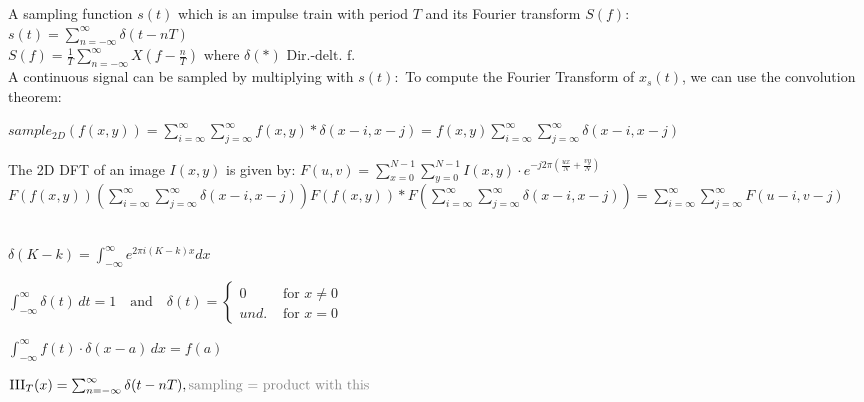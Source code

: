 
A sampling function $s(t)$ which is an impulse train with period $T$ and its Fourier transform $S(f)$:\\
\color{gray}
$s(t) = \sum_{n = -\infty}^\infty \delta\left(t - nT\right)$\\
$ S(f) = \frac{1}{T} \sum_{n = -\infty}^\infty X(f - \frac{n}{T}) \text{ where } \delta(*) \text{  Dir.-delt. f.}$\\
\color{black}
A continuous signal can be sampled by multiplying with $s(t):$ To compute the Fourier Transform of $x_s(t)$, we can use the convolution theorem:


 $sample_{2D} (f(x, y)) = \sum_{i = \infty}^{\infty} \sum_{j = \infty}^{\infty} f(x, y) * \delta(x - i, x - j) = f(x, y) \sum_{i = \infty}^{\infty}\sum_{j = \infty}^{\infty}\delta(x - i, x - j)$

The 2D DFT of an image \( I(x, y) \) is given by:
$F(u, v) = \sum_{x=0}^{N-1} \sum_{y=0}^{N-1} I(x, y) \cdot e^{-j2\pi\left(\frac{ux}{N} + \frac{vy}{N}\right)} $
$ F(f(x, y))  (\sum_{i = \infty}^{\infty}\sum_{j = \infty}^{\infty}\delta(x - i, x - j)) F(f(x, y)) * F( \sum_{i = \infty}^{\infty}\sum_{j = \infty}^{\infty}\delta(x - i, x - j)) =  \sum_{i = \infty}^{\infty}\sum_{j = \infty}^{\infty} F(u - i, v - j)$

 \\
$\delta (K - k) =  \int_{-\infty}^{\infty}e^{2 \pi i(K - k)x} dx$

$\int_{-\infty}^{\infty} \delta(t) \, dt = 1 \quad \text{and} \quad \delta(t) =  \begin{cases} 0 & \text{ for } x \neq 0 \\ und. & \text{ for } x = 0 \end{cases}$


\color{black} 
$\int_{-\infty}^{\infty} f(t) \cdot \delta(x - a) \, dx = f(a)$


$\text{III}_T(x) = \sum_{n=-\infty}^{\infty} \delta(t - nT),\\ \color{gray} \text{sampling = product with this}$

